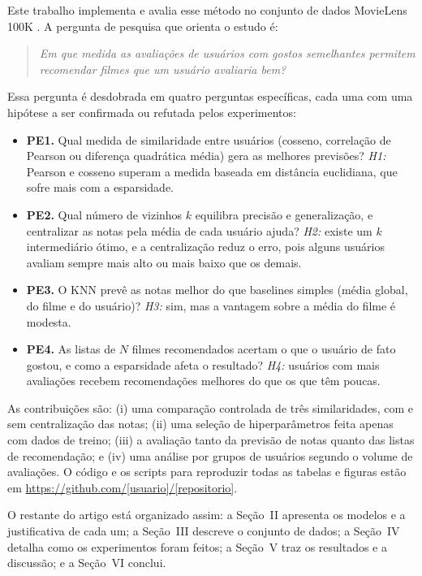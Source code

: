 \documentclass[conference]{IEEEtran}
\begin{document}
Este trabalho implementa e avalia esse m\'etodo no conjunto de dados MovieLens 100K \cite{harper2015}. A pergunta de pesquisa que orienta o estudo \'e:

\begin{quote}
\textit{Em que medida as avalia\c{c}\~oes de usu\'arios com gostos semelhantes permitem recomendar filmes que um usu\'ario avaliaria bem?}
\end{quote}

Essa pergunta \'e desdobrada em quatro perguntas espec\'ificas, cada uma com uma hip\'otese a ser confirmada ou refutada pelos experimentos:

\begin{itemize}
\item \textbf{PE1.} Qual medida de similaridade entre usu\'arios (cosseno, correla\c{c}\~ao de Pearson ou diferen\c{c}a quadr\'atica m\'edia) gera as melhores previs\~oes? \textit{H1:} Pearson e cosseno superam a medida baseada em dist\^ancia euclidiana, que sofre mais com a esparsidade.
\item \textbf{PE2.} Qual n\'umero de vizinhos $k$ equilibra precis\~ao e generaliza\c{c}\~ao, e centralizar as notas pela m\'edia de cada usu\'ario ajuda? \textit{H2:} existe um $k$ intermedi\'ario \'otimo, e a centraliza\c{c}\~ao reduz o erro, pois alguns usu\'arios avaliam sempre mais alto ou mais baixo que os demais.
\item \textbf{PE3.} O KNN prev\^e as notas melhor do que baselines simples (m\'edia global, do filme e do usu\'ario)? \textit{H3:} sim, mas a vantagem sobre a m\'edia do filme \'e modesta.
\item \textbf{PE4.} As listas de $N$ filmes recomendados acertam o que o usu\'ario de fato gostou, e como a esparsidade afeta o resultado? \textit{H4:} usu\'arios com mais avalia\c{c}\~oes recebem recomenda\c{c}\~oes melhores do que os que t\^em poucas.
\end{itemize}

As contribui\c{c}\~oes s\~ao: (i) uma compara\c{c}\~ao controlada de tr\^es similaridades, com e sem centraliza\c{c}\~ao das notas; (ii) uma sele\c{c}\~ao de hiperpar\^ametros feita apenas com dados de treino; (iii) a avalia\c{c}\~ao tanto da previs\~ao de notas quanto das listas de recomenda\c{c}\~ao; e (iv) uma an\'alise por grupos de usu\'arios segundo o volume de avalia\c{c}\~oes. O c\'odigo e os scripts para reproduzir todas as tabelas e figuras est\~ao em \url{https://github.com/[usuario]/[repositorio]}.

O restante do artigo est\'a organizado assim: a Se\c{c}\~ao~II apresenta os modelos e a justificativa de cada um; a Se\c{c}\~ao~III descreve o conjunto de dados; a Se\c{c}\~ao~IV detalha como os experimentos foram feitos; a Se\c{c}\~ao~V traz os resultados e a discuss\~ao; e a Se\c{c}\~ao~VI conclui.
\end{document}
